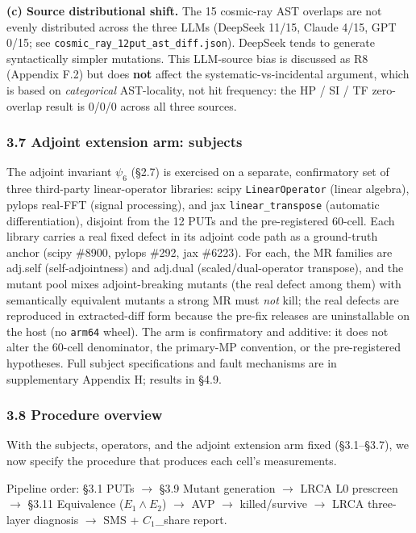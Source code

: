 \documentclass[review,12pt,authoryear]{elsarticle}
\begin{document}
\textbf{(c) Source distributional shift.} The 15 cosmic-ray AST
overlaps are not evenly distributed across the three LLMs (DeepSeek
11/15, Claude 4/15, GPT 0/15; see
\texttt{cosmic\_ray\_12put\_ast\_diff.json}). DeepSeek tends to generate
syntactically simpler mutations. This LLM-source bias is discussed as R8
(Appendix F.2) but does \textbf{not} affect the systematic-vs-incidental
argument, which is based on \emph{categorical} AST-locality, not hit
frequency: the HP / SI / TF zero-overlap result is 0/0/0 across all
three sources.

\subsubsection{3.7 Adjoint extension arm: subjects}\label{adjoint-extension-arm-subjects}

The adjoint invariant $\psi_6$ (§2.7) is exercised on a separate,
confirmatory set of three third-party linear-operator libraries:
scipy \texttt{LinearOperator} (linear algebra), pylops real-FFT (signal
processing), and jax \texttt{linear\_transpose} (automatic
differentiation), disjoint from the 12 PUTs and the pre-registered
60-cell. Each library carries a real fixed defect in its adjoint code
path as a ground-truth anchor (scipy \#8900, pylops \#292, jax \#6223).
For each, the MR families are adj.self (self-adjointness) and adj.dual
(scaled/dual-operator transpose), and the mutant pool mixes
adjoint-breaking mutants (the real defect among them) with semantically
equivalent mutants a strong MR must \emph{not} kill; the real defects are
reproduced in extracted-diff form because the pre-fix releases are
uninstallable on the host (no \texttt{arm64} wheel). The arm is
confirmatory and additive: it does not alter the 60-cell denominator, the
primary-MP convention, or the pre-registered hypotheses. Full subject
specifications and fault mechanisms are in supplementary Appendix H;
results in §4.9.

\subsubsection{3.8 Procedure overview}\label{procedure-overview}

With the subjects, operators, and the adjoint extension arm fixed
(§3.1--§3.7), we now specify the procedure that produces each cell's
measurements.

\noindent\textsf{\small Pipeline order: §3.1 PUTs $\to$ §3.9 Mutant generation $\to$ LRCA L0 prescreen $\to$ §3.11 Equivalence ($E_1 \wedge E_2$) $\to$ AVP $\to$ killed/survive $\to$ LRCA three-layer diagnosis $\to$ SMS + $C_1$\_share report.}
\end{document}
